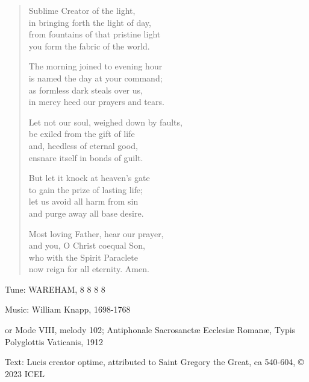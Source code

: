 \hymn

\begin{verse}
Sublime Creator of the light,\\
in bringing forth the light of day,\\
from fountains of that pristine light\\
you form the fabric of the world.

The morning joined to evening hour\\
is named the day at your command;\\
as formless dark steals over us,\\
in mercy heed our prayers and tears.

Let not our soul, weighed down by faults,\\
be exiled from the gift of life\\
and, heedless of eternal good,\\
ensnare itself in bonds of guilt.

But let it knock at heaven’s gate\\
to gain the prize of lasting life;\\
let us avoid all harm from sin\\
and purge away all base desire.

Most loving Father, hear our prayer,\\
and you, O Christ coequal Son,\\
who with the Spirit Paraclete\\
now reign for all eternity. Amen.
\end{verse}

\begin{hymnsource}
Tune: WAREHAM, 8 8 8 8

Music: William Knapp, 1698-1768

or Mode VIII, melody 102; Antiphonale Sacrosanctæ Ecclesiæ Romanæ, Typis Polyglottis Vaticanis, 1912

Text: Lucis creator optime, attributed to Saint Gregory the Great, ca 540-604, © 2023 ICEL
\end{hymnsource}